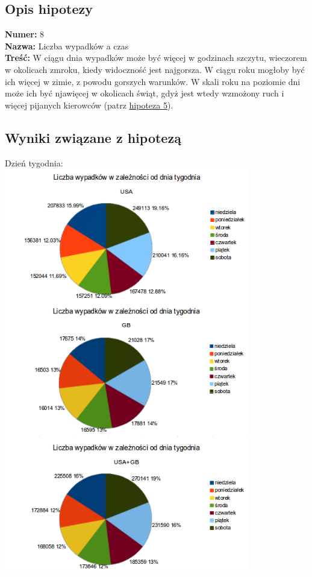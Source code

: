 \subsection{Opis hipotezy}\label{opis-hipotezy}

\textbf{Numer:} 8\\\textbf{Nazwa:} Liczba wypadków a
czas\\\textbf{Treść:} W ciągu dnia wypadków może być więcej w godzinach
szczytu, wieczorem w okolicach zmroku, kiedy widoczność jest najgorsza.
W ciągu roku mogłoby być ich więcej w zimie, z powodu gorszych warunków.
W skali roku na poziomie dni może ich być njawięcej w okolicach świąt,
gdyż jest wtedy wzmożony ruch i więcej pijanych kierowców (patrz
\href{Hipoteza-5}{hipoteza 5}).

\subsection{Wyniki związane z
hipotezą}\label{wyniki-zwiazane-z-hipoteza}

Dzień
tygodnia:\\\includegraphics[width=0.8\textwidth]{images/statistics/day_of_week.png}

